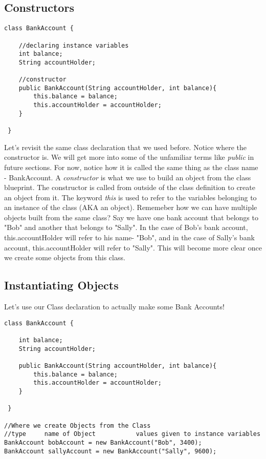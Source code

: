 \documentclass[14pt]{extreport}%
\begin{document}
\subsection*{Constructors}

\begin{lstlisting}
class BankAccount {
     
    //declaring instance variables 
    int balance;
    String accountHolder;
    
    //constructor 
    public BankAccount(String accountHolder, int balance){
        this.balance = balance;
        this.accountHolder = accountHolder;
    }

 }
\end{lstlisting}{}
Let's revisit the same class declaration that we used before. Notice where the constructor is. We will get more into some of the unfamiliar terms like \textit{public} in future sections. For now, notice how it is called the same thing as the class name - BankAccount. A \textit{constructor} is what we use to build an object from the class blueprint. The constructor is called from outside of the class definition to create an object from it. The keyword \textit{this} is used to refer to the variables belonging to an instance of the class (AKA an object). Rememeber how we can have multiple objects built from the same class? Say we have one bank account that belongs to "Bob" and another that belongs to "Sally". In the case of Bob's bank account, this.accountHolder will refer to his name- "Bob", and in the case of Sally's bank account, this.accountHolder will refer to "Sally". This will become more clear once we create some objects from this class. 

\subsection*{Instantiating Objects}
Let's use our Class declaration to actually make some Bank Accounts!
\begin{lstlisting}
class BankAccount {
      
    int balance;
    String accountHolder;

    public BankAccount(String accountHolder, int balance){
        this.balance = balance;
        this.accountHolder = accountHolder;
    }

 }
 
//Where we create Objects from the Class
//type     name of Object           values given to instance variables
BankAccount bobAccount = new BankAccount("Bob", 3400);
BankAccount sallyAccount = new BankAccount("Sally", 9600);
\end{lstlisting}{}
\end{document}
